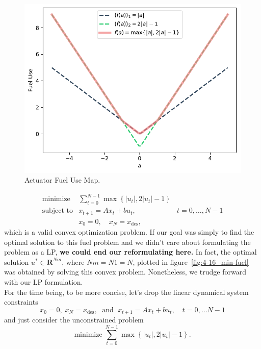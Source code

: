 \documentclass[12pt,reqno]{article}
\theoremstyle{definition}
\numberwithin{equation}{section}
\begin{document}
   \begin{figure}[h]
       \centering
       \includegraphics[width=\linewidth]{../examples/364a/cvx-ch4/actuator_fuel-use.pdf}
       \caption{Actuator Fuel Use Map.}
       \label{fig:fuel-map}
   \end{figure}

   \[\begin{array}{lll}
       \text{minimize} \; & \sum_{t=0}^{N-1} \max \left\{ \left| u_t \right|, 2 \left| u_t \right| - 1 \right\} & \\
       \text{subject to} & x_{t+1} = Ax_t + bu_t, \; & t=0, \ldots, N-1 \\
       & x_0 = 0, \quad x_{N} = x_{\text{des}},
       \end{array}\]
   which is a valid convex optimization problem. If our goal was
   simply to find the optimal solution to this fuel problem and we didn't care about 
   formulating the problem as a LP, \textbf{we could end our reformulating here.} In fact,
   the optimal solution $u^* \in \mathbf{R}^{Nm}$, where $Nm = N1 = N$, plotted in figure~\ref{fig:4-16_min-fuel}
   was obtained by solving this convex problem. 
   Nonetheless, we trudge forward with our LP formulation.\\
   For the time being, to be more concise, let's drop the linear dynamical system constraints
   \[x_0 = 0, \; x_N = x_{\text{des}}, \; \text{ and } \; x_{t+1} = Ax_t + bu_t, \quad t = 0, \ldots N-1\]
   and just consider the unconstrained problem
   \[\text{minimize} \; \sum_{t=0}^{N-1} \max \left\{ \left| u_t \right|, 2 \left| u_t \right| - 1 \right\}.\]
\end{document}
